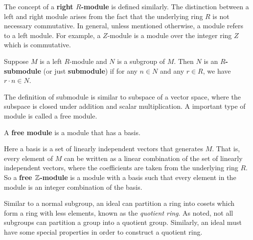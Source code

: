 \documentclass[../main.tex]{subfiles}
\begin{document}
The concept of a \textbf{right $R$-module} is defined similarly. The distinction between a left and right module arises from the fact that the underlying ring $R$ is not necessary commutative. In general, unless mentioned otherwise, a module refers to a left module. For example, a $Z$-module is a module over the integer ring $Z$ which is commutative. 

\begin{definition}
Suppose $M$ is a left $R$-module and $N$ is a subgroup of $M$. Then $N$ is an \textbf{$R$-submodule} (or just \textbf{submodule}) if for any $n \in N$ and any $r \in R$, we have $r \cdot n \in N$.
\end{definition}
The definition of submodule is similar to subspace of a vector space, where the subspace is closed under addition and scalar multiplication. A important type of module is called a free module. 

\begin{definition}
A \textbf{free module} \reversemarginpar
{}
is a module that has a basis. 
\end{definition}
Here a basis is a set of linearly independent vectors that generates $M$. That is, every element of $M$ can be written as a linear combination of the set of linearly independent vectors, where the coefficients are taken from the underlying ring $R$. So a \textbf{free $\mathbb{Z}$-module} is a module with a basis such that every element in the module is an integer combination of the basis. 


\reversemarginpar
{}
Similar to a normal subgroup, an ideal can partition a ring into cosets which form a ring with less elements, known as the  \textit{quotient ring}. As noted, not all subgroups can partition a group into a quotient group. Similarly, an ideal must have some special properties in order to construct a quotient ring. 
\end{document}
